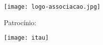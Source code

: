 {\begin{titlingpage}
\begin{figure}[b]
\begin{minipage}[c]{5cm}
				\vspace{1em}
				\texttt{[image: logo-associacao.jpg]}
			\end{minipage}\hfill
			\begin{minipage}[r]{5cm}
				\centering

				{\large Patrocínio:}

				\vspace{1em}
				\texttt{[image: itau]}
			\end{minipage}
		\end{figure}
		\clearpage
		\iftoggle{teacher}{
			\end{paracol}
		}{}
	\end{titlingpage}


	\undef\autor%
	\undef\autores%
	\undef\revisor%
	\undef\revisores%
	\revisaofalse%

	\let\la@versao\relax
	\undef\la@autorcapa
	\undef\la@graficos
	\undef\la@versaodigital
	\undef\la@ccbysa


}
